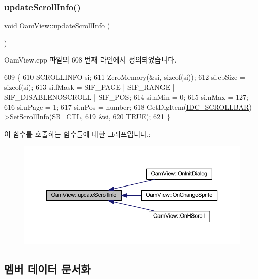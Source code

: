 \subsubsection{\texorpdfstring{update\+Scroll\+Info()}{updateScrollInfo()}}
{\footnotesize\ttfamily void Oam\+View\+::update\+Scroll\+Info (\begin{DoxyParamCaption}{ }\end{DoxyParamCaption})}



Oam\+View.\+cpp 파일의 608 번째 라인에서 정의되었습니다.


\begin{DoxyCode}
609 \{
610   SCROLLINFO si;
611   ZeroMemory(&si, \textcolor{keyword}{sizeof}(si));
612   si.cbSize = \textcolor{keyword}{sizeof}(si);
613   si.fMask = SIF\_PAGE | SIF\_RANGE | SIF\_DISABLENOSCROLL | SIF\_POS;
614   si.nMin = 0;
615   si.nMax = 127;
616   si.nPage = 1;
617   si.nPos = number;
618   GetDlgItem(\mbox{\hyperlink{resource_8h_ae17ccfaa60dc621c2a9b5650c81afe77}{IDC\_SCROLLBAR}})->SetScrollInfo(SB\_CTL,
619                                            &si,
620                                            TRUE);    
621 \}
\end{DoxyCode}
이 함수를 호출하는 함수들에 대한 그래프입니다.\+:
\nopagebreak
\begin{figure}[H]
\begin{center}
\leavevmode
\includegraphics[width=350pt]{class_oam_view_ae51c17aebff73f557073546febb45eba_icgraph}
\end{center}
\end{figure}


\subsection{멤버 데이터 문서화}
\mbox{\label{class_oam_view_a808b936a1493d14a2a4bf27f3030af14}} 
